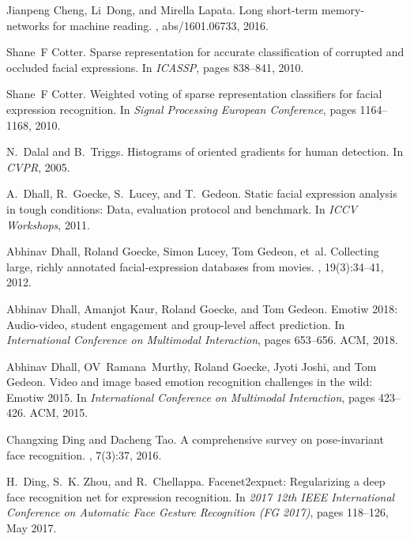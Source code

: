 \documentclass[journal]{IEEEtran}
\begin{document}
\begin{thebibliography}{10}
Jianpeng Cheng, Li~Dong, and Mirella Lapata.
\newblock Long short-term memory-networks for machine reading.
, abs/1601.06733, 2016.

Shane~F Cotter.
\newblock Sparse representation for accurate classification of corrupted and
occluded facial expressions.
\newblock In {\em ICASSP}, pages 838--841, 2010.

Shane~F Cotter.
\newblock Weighted voting of sparse representation classifiers for facial
expression recognition.
\newblock In {\em Signal Processing European Conference}, pages 1164--1168,
2010.

N.~Dalal and B.~Triggs.
\newblock Histograms of oriented gradients for human detection.
\newblock In {\em CVPR}, 2005.

A.~Dhall, R.~Goecke, S.~Lucey, and T.~Gedeon.
\newblock Static facial expression analysis in tough conditions: Data,
evaluation protocol and benchmark.
\newblock In {\em ICCV Workshops}, 2011.

Abhinav Dhall, Roland Goecke, Simon Lucey, Tom Gedeon, et~al.
\newblock Collecting large, richly annotated facial-expression databases from
movies.
, 19(3):34--41, 2012.

Abhinav Dhall, Amanjot Kaur, Roland Goecke, and Tom Gedeon.
\newblock Emotiw 2018: Audio-video, student engagement and group-level affect
prediction.
\newblock In {\em International Conference on Multimodal Interaction}, pages
653--656. ACM, 2018.

Abhinav Dhall, OV~Ramana~Murthy, Roland Goecke, Jyoti Joshi, and Tom Gedeon.
\newblock Video and image based emotion recognition challenges in the wild:
Emotiw 2015.
\newblock In {\em International Conference on Multimodal Interaction}, pages
423--426. ACM, 2015.

Changxing Ding and Dacheng Tao.
\newblock A comprehensive survey on pose-invariant face recognition.
,
7(3):37, 2016.

H.~{Ding}, S.~K. {Zhou}, and R.~{Chellappa}.
\newblock Facenet2expnet: Regularizing a deep face recognition net for
expression recognition.
\newblock In {\em 2017 12th IEEE International Conference on Automatic Face
	Gesture Recognition (FG 2017)}, pages 118--126, May 2017.


\end{thebibliography}
\end{document}
